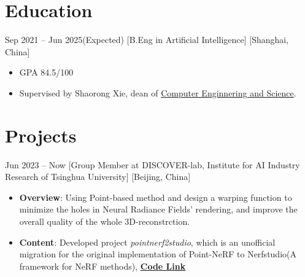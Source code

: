 \documentclass{chicv}
\begin{document}
\begin{basicinfo}
\end{basicinfo}


\section{Education}
  {Sep 2021 -- Jun 2025(Expected)}
  [B.Eng in Artificial Intelligence]
  [Shanghai, China]
  \begin{itemize}
    \item GPA 84.5/100
    \item Supervised by Shaorong Xie, dean of \href{https://cs.shu.edu.cn/}{Computer Enginnering and Science}.
  \end{itemize}

\section{Projects}

  {Jun 2023 -- Now}
  [Group Member at DISCOVER-lab, Institute for AI Industry Research of Tsinghua University]
  [Beijing, China]
  \begin{itemize}
    \item \textbf{Overview}: Using Point-based method and design a warping function to minimize the holes in Neural Radiance Fields' rendering, and improve the overall quality of the whole 3D-reconstrction.
    \item \textbf{Content}: Developed project \textit{pointnerf2studio}, which is an unofficial migration for the original implementation of Point-NeRF to Nerfstudio(A framework for NeRF methods), \textbf{\href{https://github.com/SHUzhekiNg/pointnerf2studio}{Code Link}}
  \end{itemize}
\end{document}
